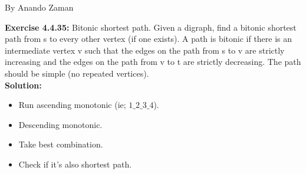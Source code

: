 \documentclass[11pt,fleqn]{article}
\begin{document}
By Anando Zaman


\textbf{Exercise 4.4.35:}  Bitonic shortest path. Given a digraph, find a bitonic shortest path from s to every
other vertex (if one exists). A path is bitonic if there is an intermediate vertex v such
that the edges on the path from s to v are strictly increasing and the edges on the path
from v to t are strictly decreasing. The path should be simple (no repeated vertices).\\

\textbf{Solution:}

\begin{itemize}
	\item Run ascending monotonic (ie; $1\_2\_3\_4$).
	\item Descending monotonic.
	\item Take best combination.
	\item Check if it's also shortest path.
\end{itemize}


	
\end{document}

